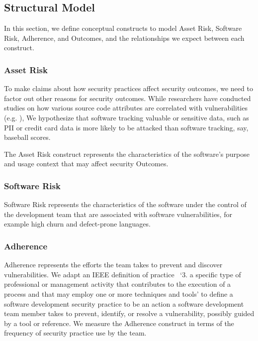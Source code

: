 \subsection{Structural Model}
 \label{sec:model_structual}
In this section, we define conceptual constructs to model Asset Risk, Software Risk, Adherence, and Outcomes, and the relationships we expect between each construct. 

\subsubsection{Asset Risk}

To make claims about how security practices affect security outcomes, we need to factor out other reasons for security outcomes. While researchers have conducted studies on how various source code attributes are correlated with vulnerabilities (e.g. ),  We hypothesize that software tracking valuable or sensitive data, such as PII or credit card data is more likely to be attacked than software tracking, say, baseball scores. 

The Asset Risk construct represents the characteristics of the software's purpose and usage context that may affect security Outcomes.

\subsubsection{Software Risk}
Software Risk represents the characteristics of the software under the control of the development team that are associated with software vulnerabilities, for example high churn and defect-prone languages. 

\subsubsection{Adherence}
\label{sec:model_contruct_adherence}
Adherence represents the efforts the team takes to prevent and discover vulnerabilities. We adapt an IEEE definition of practice~\cite{ieee1990glossary} `3. a specific type of professional or management activity that contributes to 
the execution of a process and that may employ one or more techniques and tools' to define a software development security practice to be an action a software development team member takes to prevent, identify, or resolve a vulnerability, possibly guided by a tool or reference. We measure the Adherence construct in terms of the frequency  of security practice use by the team.  

